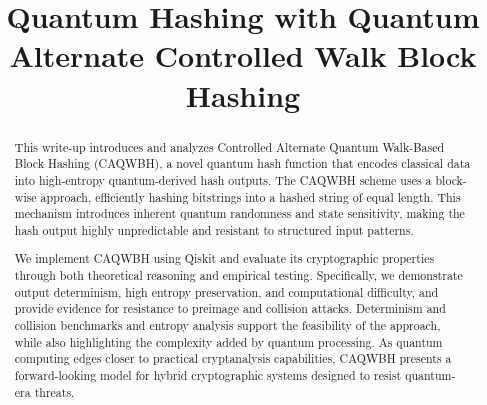 \documentclass[conference]{IEEEtran}
\begin{document}
\title{Quantum Hashing with Quantum Alternate Controlled Walk Block Hashing\\

}

\author{
\and

\and

\and

\and

\and


}

\maketitle

\begin{abstract}
This write-up introduces and analyzes Controlled Alternate Quantum Walk-Based Block Hashing (CAQWBH), a novel quantum hash function that encodes classical data into high-entropy quantum-derived hash outputs. The CAQWBH scheme uses a block-wise approach, efficiently hashing bitstrings into a hashed string of equal length. This mechanism introduces inherent quantum randomness and state sensitivity, making the hash output highly unpredictable and resistant to structured input patterns.

We implement CAQWBH using Qiskit and evaluate its cryptographic properties through both theoretical reasoning and empirical testing. Specifically, we demonstrate output determinism, high entropy preservation, and computational difficulty, and provide evidence for resistance to preimage and collision attacks. Determinism and collision benchmarks and entropy analysis support the feasibility of the approach, while also highlighting the complexity added by quantum processing. As quantum computing edges closer to practical cryptanalysis capabilities, CAQWBH presents a forward-looking model for hybrid cryptographic systems designed to resist quantum-era threats.
\end{abstract}
\end{document}
